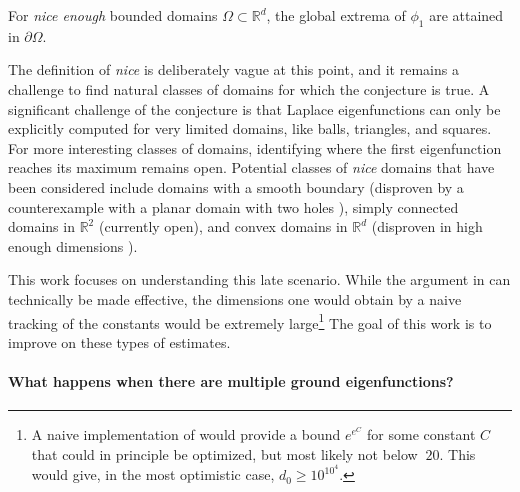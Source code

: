 \begin{conjecture}
    For \emph{nice enough} bounded domains $\Omega\subset \mathbb R^d$, the global extrema of $\phi_1$ are attained in $\partial \Omega$.
\end{conjecture}
 
The definition of \emph{nice} is deliberately vague at this point, and it remains a challenge to find natural classes of domains for which the conjecture is true. A significant challenge of the conjecture is that Laplace eigenfunctions can only be explicitly computed for very limited domains, like balls, triangles, and squares. For more interesting classes of domains, identifying where the first eigenfunction reaches its maximum remains open. Potential classes of \emph{nice} domains that have been considered include domains with a smooth boundary (disproven by a counterexample with a planar domain with two holes \cite{burdzy_counterexample_1999}), simply connected domains in $\mathbb R^2$ (currently open), and convex domains in $\mathbb R^d$ (disproven in high enough dimensions \cite{pont_convex_2024}).

This work focuses on understanding this late scenario. While the argument in \cite{pont_convex_2024} can technically be made effective, the dimensions one would obtain by a naive tracking of the constants would be extremely large\footnote{A naive implementation of \cite{pont_convex_2024} would provide a bound $e^{e^{C}}$ for some constant $C$ that could in principle be optimized, but most likely not below $~20$. This would give, in the most optimistic case, $d_0\ge 10^{10^4}$.} The goal of this work is to improve on these types of estimates.

\paragraph{What happens when there are multiple ground eigenfunctions?}


